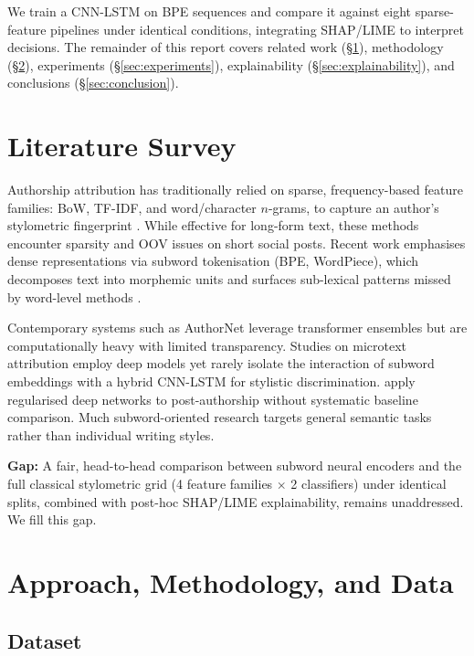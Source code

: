 \documentclass[11pt]{article}
\begin{document}
We train a CNN-LSTM on BPE sequences and compare it against eight sparse-feature pipelines under identical conditions, integrating SHAP/LIME to interpret decisions. The remainder of this report covers related work (\S\ref{sec:related}), methodology (\S\ref{sec:method}), experiments (\S\ref{sec:experiments}), explainability (\S\ref{sec:explainability}), and conclusions (\S\ref{sec:conclusion}).

\section{Literature Survey}
\label{sec:related}

Authorship attribution has traditionally relied on sparse, frequency-based feature families: BoW, TF-IDF, and word/character $n$-grams, to capture an author's stylometric fingerprint \citep{theophilo2021authorship}. While effective for long-form text, these methods encounter sparsity and OOV issues on short social posts. Recent work emphasises dense representations via subword tokenisation (BPE, WordPiece), which decomposes text into morphemic units and surfaces sub-lexical patterns missed by word-level methods \citep{sennrich2016neural,hossain2025authornet}.

Contemporary systems such as AuthorNet \citep{hossain2025authornet} leverage transformer ensembles but are computationally heavy with limited transparency. Studies on microtext attribution \citep{suman2021authorship,modupe2022subword} employ deep models yet rarely isolate the interaction of subword embeddings with a hybrid CNN-LSTM for stylistic discrimination. \citet{modupe2022applied} apply regularised deep networks to post-authorship without systematic baseline comparison. Much subword-oriented research \citep{toraman2023tokenization,drzik2026morphology} targets general semantic tasks rather than individual writing styles.

\textbf{Gap:} A fair, head-to-head comparison between subword neural encoders and the full classical stylometric grid (4 feature families $\times$ 2 classifiers) under identical splits, combined with post-hoc SHAP/LIME explainability, remains unaddressed. We fill this gap.

\section{Approach, Methodology, and Data}
\label{sec:method}

\subsection{Dataset}
\label{sec:dataset}
\end{document}
